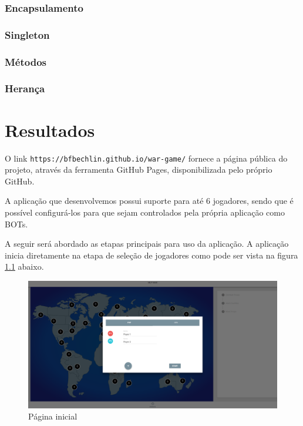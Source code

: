\documentclass[rel_mlp]{iiufrgs}
\begin{document}
\subsection{Encapsulamento}

\subsection{Singleton}

\subsection{Métodos}

\subsection{Herança}

\chapter{Resultados}

O link \texttt{https://bfbechlin.github.io/war-game/} fornece a página pública do projeto, através da ferramenta GitHub Pages, disponibilizada pelo próprio GitHub.

A aplicação que desenvolvemos possui suporte para até 6 jogadores, sendo que é possível configurá-los para que sejam controlados pela própria aplicação como BOTs.

A seguir será abordado as etapas principais para uso da aplicação. A aplicação inicia diretamente na etapa de seleção de jogadores como pode ser vista na figura \ref{fig:landing} abaixo.

\begin{figure}[h!]
\centering
  \includegraphics[width=1.0\textwidth]{images/landing.png}
  \caption{Página inicial}
  \label{fig:landing}
\end{figure}
\end{document}
